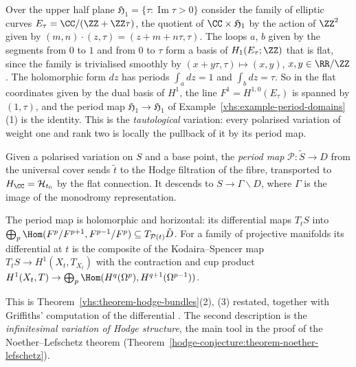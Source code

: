 \begin{example}\label{vhs:example-upper-half-plane}
Over the upper half plane $\mathfrak{H}_1 = \{\tau : \operatorname{Im}\tau > 0\}$ consider the family of elliptic curves $E_\tau = \CC/(\ZZ + \ZZ\tau)$, the quotient of $\CC \times \mathfrak{H}_1$ by the action of $\ZZ^2$
given by $(m, n) \cdot (z, \tau) = (z + m + n\tau, \tau)$. The loops $a$, $b$ given by the segments from $0$ to $1$ and from $0$ to $\tau$ form a basis of $H_1(E_\tau; \ZZ)$ that is flat, since the family is
trivialised smoothly by $(x + y\tau, \tau) \mapsto (x, y)$, $x, y \in \RR/\ZZ$. The holomorphic form $dz$ has periods $\int_adz = 1$ and $\int_bdz = \tau$. So in the flat coordinates given by the dual basis of
$H^1$, the line $F^1 = H^{1,0}(E_\tau)$ is spanned by $(1, \tau)$, and the period map $\mathfrak{H}_1 \to \mathfrak{H}_1$ of Example~\ref{vhs:example-period-domains}(1) is the identity. This is the
\emph{tautological} variation: every polarised variation of weight one and rank two is locally the pullback of it by its period map.
\end{example}

\begin{definition}\label{vhs:definition-period-map}
Given a polarised variation on $S$ and a base point, the \emph{period map} $\mathcal{P} \colon \tilde S \to D$ from the universal cover sends $\tilde t$ to the Hodge filtration of the fibre, transported to
$H_\CC = \mathcal{H}_{t_0}$ by the flat connection. It descends to $S \to \Gamma\backslash D$, where $\Gamma$ is the image of the monodromy representation.
\end{definition}

\begin{proposition}\label{vhs:proposition-period-map}
The period map is holomorphic and horizontal: its differential maps $T_tS$ into $\bigoplus_p\Hom(F^p/F^{p+1}, F^{p-1}/F^p) \subseteq T_{\mathcal{P}(t)}\check D$. For a family of projective
manifolds its differential at $t$ is the composite of the Kodaira--Spencer map $T_tS \to H^1(X_t, T_{X_t})$ with the contraction and cup product
$H^1(X_t, T) \to \bigoplus_p\Hom(H^q(\Omega^p), H^{q+1}(\Omega^{p-1}))$.
\end{proposition}

This is Theorem~\ref{vhs:theorem-hodge-bundles}(2), (3) restated, together with Griffiths' computation of the differential \cite[Chapter 10]{voisin-hodge-1}. The second description is
the \emph{infinitesimal variation of Hodge structure}, the main tool in the proof of the Noether--Lefschetz theorem (Theorem~\ref{hodge-conjecture:theorem-noether-lefschetz}).

